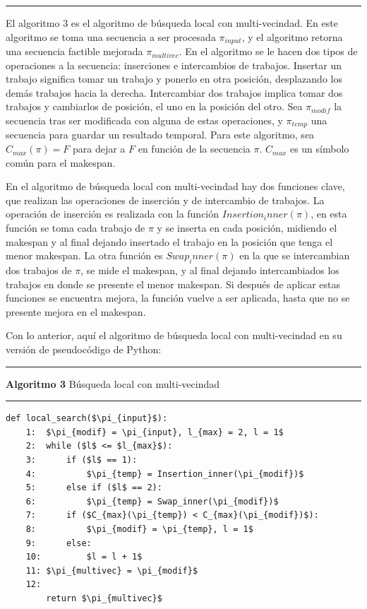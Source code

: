 \documentclass{article}
\begin{document}
\noindent\noindent
\rule{\linewidth}{0.4pt}

\vspace{\baselineskip}
El algoritmo 3 es el algoritmo de búsqueda local con multi-vecindad. En este algoritmo se toma una secuencia a ser procesada $\pi_{input}$, y el algoritmo retorna una secuencia factible mejorada $\pi_{multivec}$. En el algoritmo se le hacen dos tipos de operaciones a la secuencia: inserciones e intercambios de trabajos. Insertar un trabajo significa tomar un trabajo y ponerlo en otra posición, desplazando los demás trabajos hacia la derecha. Intercambiar dos trabajos implica tomar dos trabajos y cambiarlos de posición, el uno en la posición del otro. Sea $\pi_{modif}$ la secuencia tras ser modificada con alguna de estas operaciones, y $\pi_{temp}$ una secuencia para guardar un resultado temporal. Para este algoritmo, sea $C_{max}(\pi) = F$ para dejar a $F$ en función de la secuencia $\pi$. $C_{max}$ es un símbolo común para el makespan. \autocite{algMNIG}

\vspace{\baselineskip}
En el algoritmo de búsqueda local con multi-vecindad hay dos funciones clave, que realizan las operaciones de inserción y de intercambio de trabajos. La operación de inserción es realizada con la función $Insertion_inner(\pi)$, en esta función se toma cada trabajo de $\pi$ y se inserta en cada posición, midiendo el makespan y al final dejando insertado el trabajo en la posición que tenga el menor makespan. La otra función es $Swap_inner(\pi)$ en la que se intercambian dos trabajos de $\pi$, se mide el makespan, y al final dejando intercambiados los trabajos en donde se presente el menor makespan. Si después de aplicar estas funciones se encuentra mejora, la función vuelve a ser aplicada, hasta que no se presente mejora en el makespan. \autocite{algMNIG}

\vspace{\baselineskip}
Con lo anterior, aquí el algoritmo de búsqueda local con multi-vecindad en su versión de pseudocódigo de Python:

\noindent\noindent
\rule{\linewidth}{0.4pt}

\textbf{Algoritmo 3} Búsqueda local con multi-vecindad

\noindent\noindent
\rule{\linewidth}{0.4pt}

\begin{lstlisting}[mathescape=true]
    def local_search($\pi_{input}$):
    1:  $\pi_{modif} = \pi_{input}, l_{max} = 2, l = 1$
    2:  while ($l$ <= $l_{max}$):
    3:      if ($l$ == 1):
    4:          $\pi_{temp} = Insertion_inner(\pi_{modif})$
    5:      else if ($l$ == 2):
    6:          $\pi_{temp} = Swap_inner(\pi_{modif})$
    7:      if ($C_{max}(\pi_{temp}) < C_{max}(\pi_{modif})$):
    8:          $\pi_{modif} = \pi_{temp}, l = 1$
    9:      else:
    10:         $l = l + 1$
    11: $\pi_{multivec} = \pi_{modif}$
    12:
        return $\pi_{multivec}$
\end{lstlisting}
\end{document}
